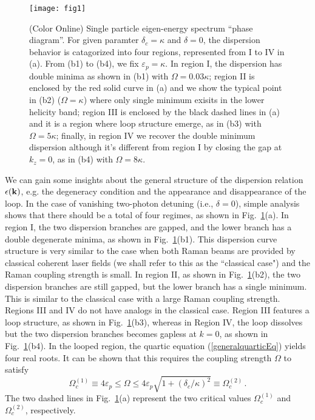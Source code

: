 \documentclass[atoms,article,submit,moreauthors,pdftex,12pt,a4paper]{mdpi}
\begin{document}
\begin{figure}[htp]
\texttt{[image: fig1]}\caption{ (Color Online) Single particle eigen-energy spectrum ``phase diagram''. For given paramter $\delta_c=\kappa$ and $\delta=0$, the dispersion behavior is catagorized into four regions, represented from I to IV in (a). From (b1) to (b4), we fix $\varepsilon_p=\kappa$. In region I, the dispersion has double minima as shown in (b1) with $\Omega=0.03\kappa$; region II is enclosed by the red solid curve in (a) and we show the typical point in (b2) ($\Omega=\kappa$) where only single minimum exisits in the lower helicity band; region III is enclosed by the black dashed lines in (a) and it is a region where loop structure emerge, as in (b3) with $\Omega=5\kappa$; finally, in region IV we recover the double minimum dispersion although it's different from region I by closing the gap at $k_z=0$, as in (b4) with $\Omega=8\kappa$.}\label{fig1}
\end{figure}

We can gain some insights about the general structure of the dispersion relation $\epsilon({\bf k})$, e.g. the degeneracy condition and the appearance and disappearance of the loop. In the case of vanishing two-photon detuning (i.e., $\delta=0$),
simple analysis shows that there should be a total of four regimes, as shown in Fig.~\ref{fig1}(a). In region I, the two dispersion branches are gapped, and the lower branch has a double degenerate minima, as shown in Fig.~\ref{fig1}(b1). This dispersion curve structure is very similar to the case when both Raman beams are provided by classical coherent laser fields (we shall refer to this as the ``classical case") and the Raman coupling strength is small. In region II, as shown in Fig.~\ref{fig1}(b2), the two dispersion branches are still gapped, but the lower branch has a single minimum. This is similar to the classical case with a large Raman coupling strength. Regions III and IV do not have analogs in the classical case. Region III features a loop structure, as shown in Fig.~\ref{fig1}(b3), whereas in Region IV, the loop dissolves but the two dispersion branches becomes gapless at $k=0$, as shown in Fig.~\ref{fig1}(b4). In the looped region, the quartic equation (\ref{generalquarticEq}) yields four real roots. It can be shown \cite{cavitySOC} that this requires the coupling strength $\Omega$ to satisfy
\[\Omega_c^{(1)}\equiv4\varepsilon_p\leq \Omega \leq  4\varepsilon_p \sqrt{1+(\delta_c/\kappa)^2}\equiv\Omega_c^{(2)} \,.\]
The two dashed lines in Fig.~\ref{fig1}(a) represent the two critical values $\Omega_c^{(1)}$ and $\Omega_c^{(2)}$, respectively.
\end{document}
